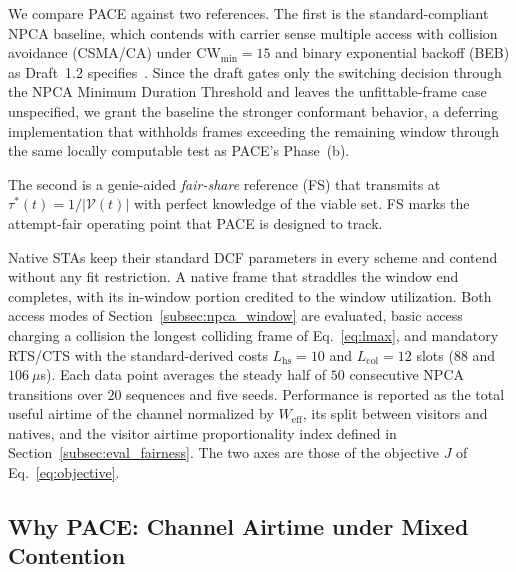 \documentclass[journal,10pt]{IEEEtran}
\newcommand{\Nvis}{N_\mathrm{vis}}
\begin{document}
We compare PACE against two references. The first is the standard-compliant NPCA baseline, which contends with carrier sense multiple access with collision avoidance (CSMA/CA) under $\mathrm{CW}_{\min}=15$ and binary exponential backoff (BEB) as Draft~1.2 specifies~\cite{ieee80211bn}. Since the draft gates only the switching decision through the NPCA Minimum Duration Threshold and leaves the unfittable-frame case unspecified, we grant the baseline the stronger conformant behavior, a deferring implementation that withholds frames exceeding the remaining window through the same locally computable test as PACE's Phase~(b).

The second is a genie-aided \emph{fair-share} reference (FS) that transmits at $\tau^*(t)=1/|\mathcal{V}(t)|$ with perfect knowledge of the viable set. FS marks the attempt-fair operating point that PACE is designed to track.

Native STAs keep their standard DCF parameters in every scheme and contend without any fit restriction. A native frame that straddles the window end completes, with its in-window portion credited to the window utilization. Both access modes of Section~\ref{subsec:npca_window} are evaluated, basic access charging a collision the longest colliding frame of Eq.~\eqref{eq:lmax}, and mandatory RTS/CTS with the standard-derived costs $L_\mathrm{hs}=10$ and $L_\mathrm{col}=12$ slots ($88$ and $106~\mu$s). Each data point averages the steady half of $50$ consecutive NPCA transitions over $20$ sequences and five seeds. Performance is reported as the total useful airtime of the channel normalized by $W_\mathrm{eff}$, its split between visitors and natives, and the visitor airtime proportionality index defined in Section~\ref{subsec:eval_fairness}. The two axes are those of the objective $J$ of Eq.~\eqref{eq:objective}.

\subsection{Why PACE: Channel Airtime under Mixed Contention}
\label{subsec:eval_whypace}
\end{document}
